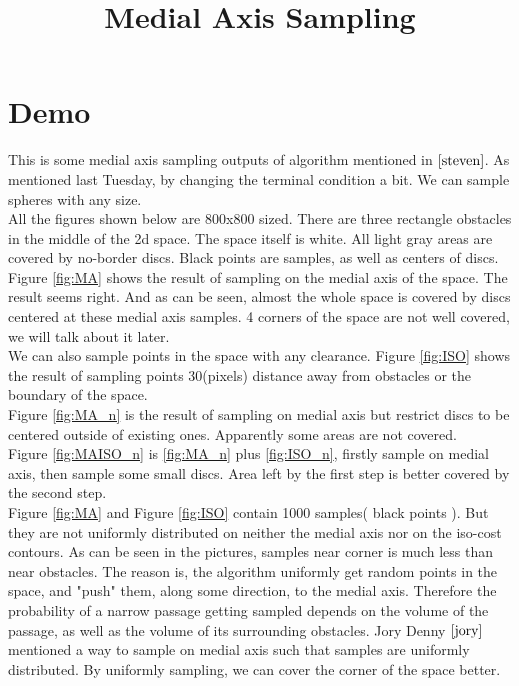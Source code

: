 \documentclass[12pt]{article}
\title{Medial Axis Sampling}
\date{}
\begin{document}
  \maketitle
  
  \section{Demo}
  
  This is some medial axis sampling outputs of algorithm mentioned in $\cite{steven}$. As mentioned last Tuesday, by changing the terminal condition a bit. We can sample spheres with any size.\\
  
  All the figures shown below are 800x800 sized. There are three rectangle obstacles in the middle of the 2d space. The space itself is white. All light gray areas are covered by no-border discs. Black points are samples, as well as centers of discs.\\
  
  Figure \ref{fig:MA} shows the result of sampling on the medial axis of the space. The result seems right. And as can be seen, almost the whole space is covered by discs centered at these medial axis samples. 4 corners of the space are not well covered, we will talk about it later.\\ 
  
  We can also sample points in the space with any clearance. Figure \ref{fig:ISO} shows the result of sampling points 30(pixels) distance away from obstacles or the boundary of the space.\\
  
  Figure \ref{fig:MA_n} is the result of sampling on medial axis but restrict discs to be centered outside of existing ones. Apparently some areas are not covered. \\
  
  Figure \ref{fig:MAISO_n} is \ref{fig:MA_n} plus \ref{fig:ISO_n}, firstly sample on medial axis, then sample some small discs. Area left by the first step is better covered by the second step.\\ 
  
  Figure \ref{fig:MA} and Figure \ref{fig:ISO} contain 1000 samples( black points ). But they are not uniformly distributed on neither the medial axis nor on the iso-cost contours. As can be seen in the pictures, samples near corner is much less than near obstacles. The reason is, the algorithm uniformly get random points in the space, and "push" them, along some direction, to the medial axis. Therefore the probability of a narrow passage getting sampled depends on the volume of the passage, as well as the volume of its surrounding obstacles. Jory Denny $\cite{jory}$ mentioned a way to sample on medial axis such that samples are uniformly distributed. By uniformly sampling, we can cover the corner of the space better. \\
   
\end{document}
